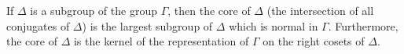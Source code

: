 If $\Delta$ is a subgroup of the group $\Gamma$, then the core of $\Delta$ (the intersection of all conjugates of $\Delta$) is the largest subgroup of $\Delta$ which is normal in $\Gamma$. Furthermore, the core of $\Delta$ is the kernel of the representation of $\Gamma$ on the right cosets of $\Delta$.
